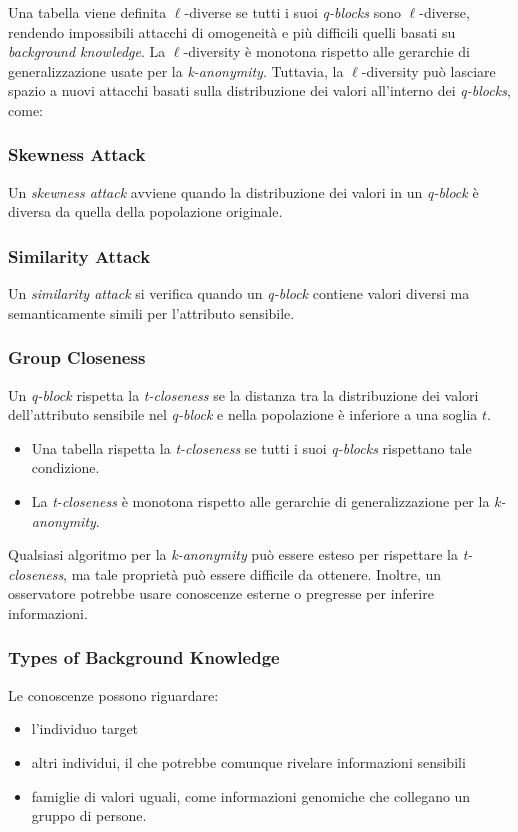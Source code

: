 \documentclass{report}
\begin{document}
\noindent Una tabella viene definita $\ell$-diverse se tutti i suoi \textit{q-blocks} sono $\ell$-diverse, rendendo impossibili attacchi di omogeneità e più difficili quelli basati su \textit{background knowledge}. 
La $\ell$-diversity è monotona rispetto alle gerarchie di generalizzazione usate per la \textit{k-anonymity}. 
Tuttavia, la $\ell$-diversity può lasciare spazio a nuovi attacchi basati sulla distribuzione dei valori all'interno dei \textit{q-blocks}, come:

\subsubsection{Skewness Attack}
Un \textit{skewness attack} avviene quando la distribuzione dei valori in un \textit{q-block} è diversa da quella della popolazione originale.

\subsubsection{Similarity Attack}
Un \textit{similarity attack} si verifica quando un \textit{q-block} contiene valori diversi ma semanticamente simili per l'attributo sensibile.

\subsubsection{Group Closeness}
Un \textit{q-block} rispetta la \textit{t-closeness} se la distanza tra la distribuzione dei valori dell'attributo sensibile nel \textit{q-block} e nella popolazione è inferiore a una soglia $t$.
\begin{itemize}
    \item Una tabella rispetta la \textit{t-closeness} se tutti i suoi \textit{q-blocks} rispettano tale condizione.
    \item La \textit{t-closeness} è monotona rispetto alle gerarchie di generalizzazione per la \textit{k-anonymity}.
\end{itemize}

\noindent Qualsiasi algoritmo per la \textit{k-anonymity} può essere esteso per rispettare la \textit{t-closeness}, ma tale proprietà può essere difficile da ottenere. 
Inoltre, un osservatore potrebbe usare conoscenze esterne o pregresse per inferire informazioni.

\subsubsection{Types of Background Knowledge}
Le conoscenze possono riguardare:
\begin{itemize}
    \item l'individuo target
    \item altri individui, il che potrebbe comunque rivelare informazioni sensibili
    \item famiglie di valori uguali, come informazioni genomiche che collegano un gruppo di persone.
\end{itemize}
\end{document}
